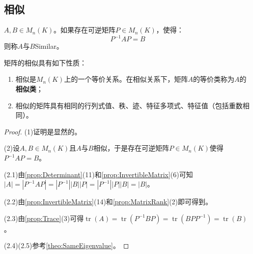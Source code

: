 \subsection{相似}
\begin{definition}
	$A,B\in M_{n}(K)$。如果存在可逆矩阵$P\in M_{n}(K)$，使得：
	\begin{equation*}
		P^{-1}AP=B
	\end{equation*}
	则称$A$与$B$\gls{Similar}。
\end{definition}
\begin{property}\label{prop:SimilarMatrix}
	矩阵的相似具有如下性质：
	\begin{enumerate}
		\item 相似是$M_{n}(K)$上的一个等价关系。在相似关系下，矩阵$A$的等价类称为$A$的\textbf{相似类}；
		\item 相似的矩阵具有相同的行列式值、秩、迹、特征多项式、特征值（包括重数相同）。
	\end{enumerate}
\end{property}
\begin{proof}
	(1)证明是显然的。\par
	(2)设$A,B\in M_{n}(K)$且$A$与$B$相似，于是存在可逆矩阵$P\in M_{n}(K)$使得$P^{-1}AP=B$。\par
	(2.1)由\cref{prop:Determinant}(11)和\cref{prop:InvertibleMatrix}(6)可知$|A|=|P^{-1}AP|=|P^{-1}||B||P|=|P^{-1}||P||B|=|B|$。\par
	(2.2)由\cref{prop:InvertibleMatrix}(14)和\cref{prop:MatrixRank}(2)即可得到。\par
	(2.3)由\cref{prop:Trace}(3)可得$\operatorname{tr}(A)=\operatorname{tr}(P^{-1}BP)=\operatorname{tr}(BPP^{-1})=\operatorname{tr}(B)$。\par
	(2.4)(2.5)参考\cref{theo:SameEigenvalue}。
\end{proof}

